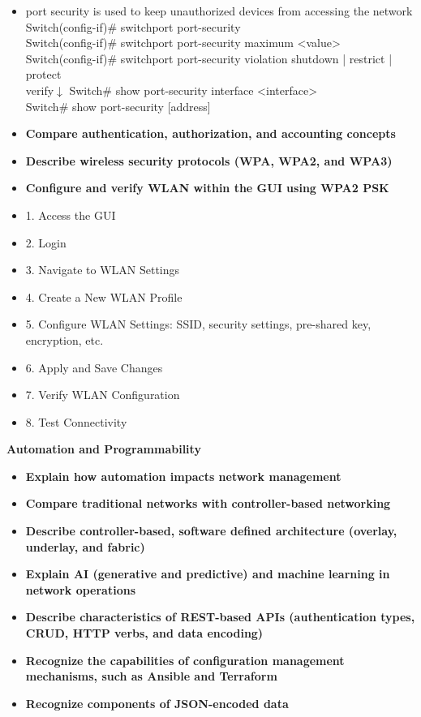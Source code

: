 \documentclass{article}
\begin{document}
\begin{itemize}
  	\item[] port security is used to keep unauthorized devices from accessing the network\\
  		Switch(config-if)\# switchport port-security\\
		Switch(config-if)\# switchport port-security maximum \textless value\textgreater\\
		Switch(config-if)\# switchport port-security violation {shutdown | restrict | protect}\\
		verify$\downarrow$
		Switch\# show port-security interface \textless interface\textgreater\\
		Switch\# show port-security [address]
  \item \textbf{Compare authentication, authorization, and accounting concepts}
  \item \textbf{Describe wireless security protocols (WPA, WPA2, and WPA3)}
  \item \textbf{Configure and verify WLAN within the GUI using WPA2 PSK}
	\item[] 1. Access the GUI
	\item[] 2. Login
	\item[] 3. Navigate to WLAN Settings
	\item[] 4. Create a New WLAN Profile
	\item[] 5. Configure WLAN Settings: SSID, security settings, pre-shared key, encryption, etc.
	\item[] 6. Apply and Save Changes
	\item[] 7. Verify WLAN Configuration
	\item[] 8. Test Connectivity

\end{itemize}



\begin{flushleft}\textbf{Automation and Programmability}\end{flushleft}
\begin{itemize}
  \item \textbf{Explain how automation impacts network management}
  \item \textbf{Compare traditional networks with controller-based networking}
  \item \textbf{Describe controller-based, software defined architecture (overlay, underlay, and fabric)} 
  \item \textbf{Explain AI (generative and predictive) and machine learning in network operations}
  \item \textbf{Describe characteristics of REST-based APIs (authentication types, CRUD, HTTP verbs, and data encoding)}
  \item \textbf{Recognize the capabilities of configuration management mechanisms, such as Ansible and Terraform}
  \item \textbf{Recognize components of JSON-encoded data}
\end{itemize}
\end{document}
